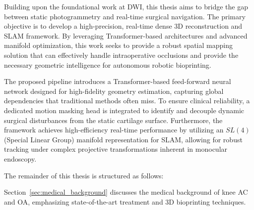 Building upon the foundational work at DWI, this thesis aims to bridge the gap between static photogrammetry and real-time surgical navigation. The primary objective is to develop a high-precision, real-time dense 3D reconstruction and SLAM framework. By leveraging Transformer-based architectures and advanced manifold optimization, this work seeks to provide a robust spatial mapping solution that can effectively handle intraoperative occlusions and provide the necessary geometric intelligence for autonomous robotic bioprinting.

The proposed pipeline introduces a Transformer-based feed-forward neural network designed for high-fidelity geometry estimation, capturing global dependencies that traditional methods often miss. To ensure clinical reliability, a dedicated motion masking head is integrated to identify and decouple dynamic surgical disturbances from the static cartilage surface. Furthermore, the framework achieves high-efficiency real-time performance by utilizing an $SL(4)$ (Special Linear Group) manifold representation for SLAM, allowing for robust tracking under complex projective transformations inherent in monocular endoscopy.

The remainder of this thesis is structured as follows:

Section~\ref{sec:medical_background} discusses the medical background of knee AC and OA, emphasizing state-of-the-art treatment and 3D bioprinting techniques.

